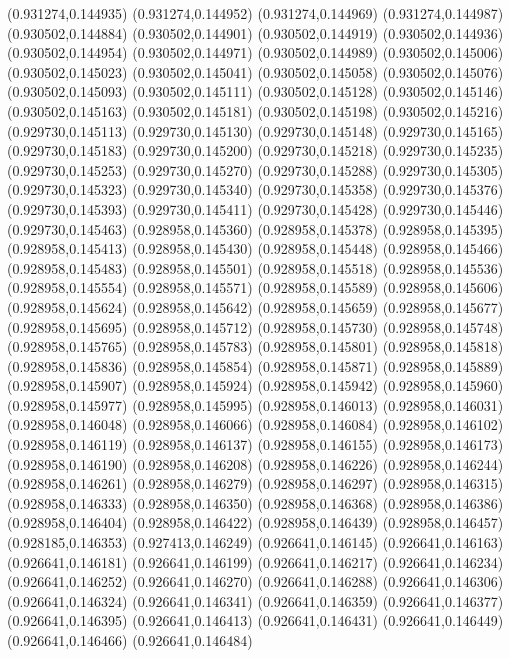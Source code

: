 (0.931274,0.144935)
(0.931274,0.144952)
(0.931274,0.144969)
(0.931274,0.144987)
(0.930502,0.144884)
(0.930502,0.144901)
(0.930502,0.144919)
(0.930502,0.144936)
(0.930502,0.144954)
(0.930502,0.144971)
(0.930502,0.144989)
(0.930502,0.145006)
(0.930502,0.145023)
(0.930502,0.145041)
(0.930502,0.145058)
(0.930502,0.145076)
(0.930502,0.145093)
(0.930502,0.145111)
(0.930502,0.145128)
(0.930502,0.145146)
(0.930502,0.145163)
(0.930502,0.145181)
(0.930502,0.145198)
(0.930502,0.145216)
(0.929730,0.145113)
(0.929730,0.145130)
(0.929730,0.145148)
(0.929730,0.145165)
(0.929730,0.145183)
(0.929730,0.145200)
(0.929730,0.145218)
(0.929730,0.145235)
(0.929730,0.145253)
(0.929730,0.145270)
(0.929730,0.145288)
(0.929730,0.145305)
(0.929730,0.145323)
(0.929730,0.145340)
(0.929730,0.145358)
(0.929730,0.145376)
(0.929730,0.145393)
(0.929730,0.145411)
(0.929730,0.145428)
(0.929730,0.145446)
(0.929730,0.145463)
(0.928958,0.145360)
(0.928958,0.145378)
(0.928958,0.145395)
(0.928958,0.145413)
(0.928958,0.145430)
(0.928958,0.145448)
(0.928958,0.145466)
(0.928958,0.145483)
(0.928958,0.145501)
(0.928958,0.145518)
(0.928958,0.145536)
(0.928958,0.145554)
(0.928958,0.145571)
(0.928958,0.145589)
(0.928958,0.145606)
(0.928958,0.145624)
(0.928958,0.145642)
(0.928958,0.145659)
(0.928958,0.145677)
(0.928958,0.145695)
(0.928958,0.145712)
(0.928958,0.145730)
(0.928958,0.145748)
(0.928958,0.145765)
(0.928958,0.145783)
(0.928958,0.145801)
(0.928958,0.145818)
(0.928958,0.145836)
(0.928958,0.145854)
(0.928958,0.145871)
(0.928958,0.145889)
(0.928958,0.145907)
(0.928958,0.145924)
(0.928958,0.145942)
(0.928958,0.145960)
(0.928958,0.145977)
(0.928958,0.145995)
(0.928958,0.146013)
(0.928958,0.146031)
(0.928958,0.146048)
(0.928958,0.146066)
(0.928958,0.146084)
(0.928958,0.146102)
(0.928958,0.146119)
(0.928958,0.146137)
(0.928958,0.146155)
(0.928958,0.146173)
(0.928958,0.146190)
(0.928958,0.146208)
(0.928958,0.146226)
(0.928958,0.146244)
(0.928958,0.146261)
(0.928958,0.146279)
(0.928958,0.146297)
(0.928958,0.146315)
(0.928958,0.146333)
(0.928958,0.146350)
(0.928958,0.146368)
(0.928958,0.146386)
(0.928958,0.146404)
(0.928958,0.146422)
(0.928958,0.146439)
(0.928958,0.146457)
(0.928185,0.146353)
(0.927413,0.146249)
(0.926641,0.146145)
(0.926641,0.146163)
(0.926641,0.146181)
(0.926641,0.146199)
(0.926641,0.146217)
(0.926641,0.146234)
(0.926641,0.146252)
(0.926641,0.146270)
(0.926641,0.146288)
(0.926641,0.146306)
(0.926641,0.146324)
(0.926641,0.146341)
(0.926641,0.146359)
(0.926641,0.146377)
(0.926641,0.146395)
(0.926641,0.146413)
(0.926641,0.146431)
(0.926641,0.146449)
(0.926641,0.146466)
(0.926641,0.146484)
